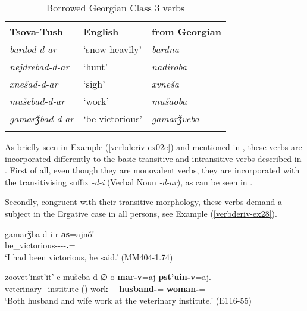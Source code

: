 \begin{table}
	\begin{tabular}{lll}
    \lsptoprule
		Tsova-Tush & English & from Georgian \\
        \midrule
		\textit{bardod-d-ar} & `snow heavily' & \textit{bardna}  \\
		\textit{nejdrebad-d-ar} & `hunt' & \textit{nadiroba} \\
		\textit{xnešad-d-ar} & `sigh' & \textit{xvneša} \\
		\textit{mušebad-d-ar} & `work' & \textit{mušaoba} \\
		\textit{gamarǯbad-d-ar} & `be victorious' & \textit{gamarǯveba} \\
    \lspbottomrule
	\end{tabular}
	\caption{Borrowed Georgian Class 3 verbs}
	\label{table-georgianborrowmed}
\end{table}

As briefly seen in Example (\ref{verbderiv-ex02c}) and mentioned in , these verbs are incorporated differently to the basic transitive and intransitive verbs described in . First of all, even though they are monovalent verbs, they are incorporated with the transitivising suffix \textit{-d-i} (Verbal Noun \textit{-d-ar}), as can be seen in .

Secondly, congruent with their transitive morphology, these verbs demand a subject in the Ergative case in all persons, see Example (\ref{verbderiv-ex28}). 

\begin{exe}
\ex\label{verbderiv-ex28}
\begin{xlist}
		\ex\label{verbderiv-ex28a}
		\gll gamarǯba-d-i-r-\textbf{as}=ajn\u{o}! \\
		be\_victorious-{\D}-{\Tr}-{\Rem}-\textbf{{\Fsg}.{\Erg}}={\Quot} \\
		\trans `I had been victorious, he said.'
		\hfill (MM404-1.74)
	
		\ex\label{verbderiv-ex28b}
		\gll zoovet'inst'it'-e mušeba-d-∅-o \textbf{mar-v}=aj \textbf{pst'uin-v}=aj. \\
		veterinary\_institute-{\Obl}({\Ess}) work-{\D}-{\Tr}-{\Npst} \textbf{husband-{\Erg}}={\Add} \textbf{woman-{\Erg}}={\Add} \\
		\trans `Both husband and wife work at the veterinary institute.' 
		\hfill (E116-55)
\end{xlist}
\end{exe}


